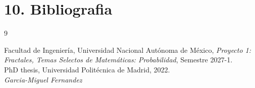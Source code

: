\documentclass[12pt,a4paper]{article}
\begin{document}
\section*{10. Bibliografia}

\begin{thebibliography}{9}

Facultad de Ingeniería, Universidad Nacional Autónoma de México,
\textit{Proyecto 1: Fractales, Temas Selectos de Matemáticas:
Probabilidad}, Semestre 2027-1. \\
PhD thesis, Universidad Politécnica de Madrid, 2022. \\
\textit{Garcia-Miguel Fernandez}
\end{thebibliography}
\end{document}
